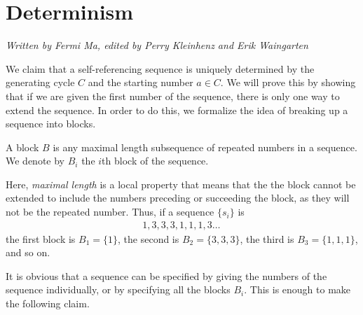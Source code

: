 \documentclass[runningheads,a4paper]{llncs}
\begin{document}
\section{Determinism}
\label{determinism}

\emph{Written by Fermi Ma, edited by Perry Kleinhenz and Erik Waingarten}

We claim that a self-referencing sequence is uniquely determined by the generating cycle $C$ and the starting number $a \in C$. We will prove this by showing that if we are given the first number of the sequence, there is only one way to extend the sequence. In order to do this, we formalize the idea of breaking up a sequence into blocks.

\begin{definition}
A block $B$ is any maximal length subsequence of repeated numbers in a sequence. We denote by $B_i$ the $i$th block of the sequence.
\end{definition}

Here, \emph{maximal length} is a local property that means that the the block cannot be extended to include the numbers preceding or succeeding the block, as they will not be the repeated number. Thus, if a sequence $\{s_i\}$ is
\begin{align*}
1,3,3,3,1,1,1,3\dots \,
\end{align*}
the first block is $B_1 = \{1\}$, the second is $B_2 = \{3,3,3\}$, the third is $B_3 = \{1,1,1\}$, and so on. 

It is obvious that a sequence can be specified by giving the numbers of the sequence individually, or by specifying all the blocks $B_i$. This is enough to make the following claim.
\end{document}
